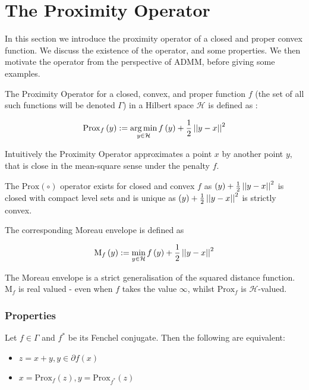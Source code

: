 \section{The Proximity Operator}\label{sec:prox}

In this section we introduce the proximity operator of a closed and proper convex function. We discuss the existence of the operator, and some properties. We then motivate the operator from the perspective of ADMM, before giving some examples.

The Proximity Operator for a closed, convex, and proper function \(f\) (the set of all such functions will be denoted \(\Gamma\)) in a Hilbert space \(\mathcal{H}\) is defined as \cite{moreau1965proximite}:

\begin{definition}\label{def:prox_operator}
\begin{equation}
\mathrm{Prox}_f\left(y\right) :=  \operatorname*{arg\,min}_{y \in \mathcal{H} } f\left(y\right) + \frac{1}{2}\left|\left|y-x\right|\right|^2
\end{equation}
\end{definition}

Intuitively the Proximity Operator approximates a point \(x\) by another point \(y\), that is close in the mean-square sense under the penalty \(f\).

The \(\mathrm{Prox}\left(\circ\right)\) operator exists for closed and convex \(f\) as \(\left(y\right) + \frac{1}{2}\left|\left|y-x\right|\right|^2\) is closed with compact level sets and is unique as \(\left(y\right) + \frac{1}{2}\left|\left|y-x\right|\right|^2\) is strictly convex.

The corresponding Moreau envelope is defined as 

\begin{definition}
\begin{equation}
\mathrm{M}_f\left(y\right) :=  \min_{y \in \mathcal{H}} f\left(y\right) + \frac{1}{2}\left|\left|y-x\right|\right|^2
\end{equation}
\end{definition}

The Moreau envelope is a strict generalisation of the squared distance function. \(\mathrm{M}_f\) is real valued - even when \(f\) takes the value \(\infty\), whilst \(\mathrm{Prox}_f \) is \(\mathcal{H}\)-valued. 

\subsubsection{Properties}
\begin{theorem}[Moreau '65]
Let \(f \in \Gamma\) and \(f^*\) be its Fenchel conjugate. Then the following are equivalent:
\begin{itemize}
\item \(z = x+y, y \in \partial f\left(x\right)\)
\item \(x = \mathrm{Prox}_f\left(z\right), y = \mathrm{Prox}_{f^*}\left(z\right)  \)
\end{itemize}
\end{theorem}

